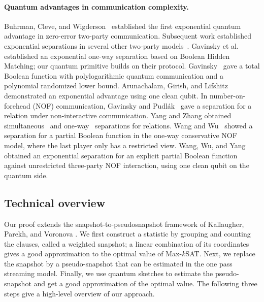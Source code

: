 \paragraph{Quantum advantages in communication complexity.}
Buhrman, Cleve, and Wigderson~\cite{BuhrmanCleveWigderson1998} established the first exponential quantum advantage in zero-error two-party communication.
Subsequent work established exponential separations in several other two-party models~\cite{Raz1999,BarYossefJayramKerenidis2008,KlartagRegev2011,commGavinsky16,commGavinsky19,commGavinsky20,commGRT22,commGGJL25}.
Gavinsky et al.~\cite{GavinskyKempeKerenidisRazDeWolf2008} established an exponential one-way separation based on Boolean Hidden Matching; our quantum primitive builds on their protocol.
Gavinsky~\cite{commGavinsky26} gave a total Boolean function with polylogarithmic quantum communication and a polynomial randomized lower bound.
Arunachalam, Girish, and Lifshitz~\cite{ArunachalamGirishLifshitz2023} demonstrated an exponential advantage using one clean qubit.
In number-on-forehead (NOF) communication, Gavinsky and Pudl\'ak~\cite{GavinskyPudlak2008} gave a separation for a relation under non-interactive communication.
Yang and Zhang obtained simultaneous~\cite{YangZhang2025Simultaneous} and one-way~\cite{YangZhang2026OneWay} separations for relations.
Wang and Wu~\cite{WangWu2026ConservativeLifting} showed a separation for a partial Boolean function in the  one-way conservative NOF model, where the last player only has a restricted view. 
Wang, Wu, and Yang~\cite{WangWuYang2026} obtained an exponential separation for an explicit partial Boolean function against unrestricted three-party NOF interaction, using one clean qubit on the quantum side.





\subsection{Technical overview}
Our proof extends the snapshot-to-pseudosnapshot framework of Kallaugher, Parekh, and Voronova \cite{KPV23}. We first construct a statistic by grouping and counting the  clauses, called a weighted snapshot; a linear combination of its coordinates gives a good approximation to the optimal value of Max-$k$SAT. 
Next,  we replace the snapshot by a pseudo-snapshot that can be estimated in the one pass streaming model.  Finally, we use quantum sketches to estimate the pseudo-snapshot and get a good approximation of  the optimal value. The following three steps give a high-level overview of our approach.

